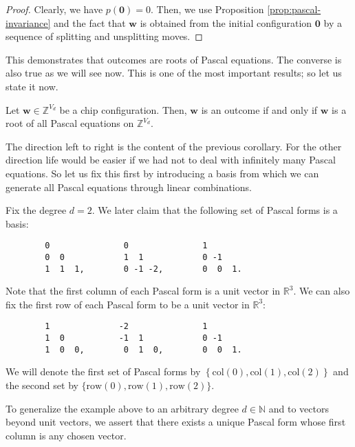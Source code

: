 \begin{proof}
    Clearly, we have \( p(\mathbf 0) = 0 \). Then, we use Proposition \ref{prop:pascal-invariance} and the fact that \( \mathbf{w} \) is obtained from the initial configuration \( \mathbf{0} \) by a sequence of splitting and unsplitting moves.
\end{proof}

This demonstrates that outcomes are roots of Pascal equations. The converse is also true as we will see now. This is one of the most important results; so let us state it now.

\begin{theorem}\label{thm:pascal-outcome}
    Let \( \mathbf{w}\in \mathbb{Z}^{V_d} \) be a chip configuration. Then, \( \mathbf{w} \) is an outcome if and only if \( \mathbf{w} \) is a root of all Pascal equations on \( \mathbb{Z}^{V_d} \).
\end{theorem}

The direction left to right is the content of the previous corollary. For the other direction life would be easier if we had not to deal with infinitely many Pascal equations. So let us fix this first by introducing a basis from which we can generate all Pascal equations through linear combinations.

\begin{example}\label{ex:pascal-basis}
    Fix the degree \( d = 2 \). We later claim that the following set of Pascal forms is a basis:
    \begin{verbatim}
        0               0               1               
        0  0            1  1            0 -1           
        1  1  1,        0 -1 -2,        0  0  1.     
    \end{verbatim}
    Note that the first column of each Pascal form is a unit vector in \( \mathbb{R}^3 \). We can also fix the first row of each Pascal form to be a unit vector in \( \mathbb{R}^3 \):
    \begin{verbatim}
        1              -2               1               
        1  0           -1  1            0 -1           
        1  0  0,        0  1  0,        0  0  1.
    \end{verbatim} 
    We will denote the first set of Pascal forms by \( \left\{ \mathrm{col}(0), \mathrm{col}(1), \mathrm{col}(2) \right\} \) and the second set by \( \{ \mathrm{row}(0), \mathrm{row}(1), \mathrm{row}(2) \} \).
\end{example}

To generalize the example above to an arbitrary degree \( d \in \mathbb{N} \) and to vectors beyond unit vectors, we assert that there exists a unique Pascal form whose first column is any chosen vector.

